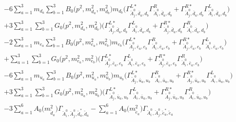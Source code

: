 \begin{itemize}
\begin{align}
 &-6 \sum_{a=1}^{3}m_{d_{{a}}} \sum_{b=1}^{3}{B_0\Big(p^{2},m^2_{d_{{a}}},m^2_{d_{{b}}}\Big)} m_{d_{{b}}} \Big({\Gamma^{L*}_{\check{A}^0_{{j}},\bar{d}_{{a}},d_{{b}}}} {\Gamma^R_{\check{A}^0_{{i}},\bar{d}_{{a}},d_{{b}}}}  + {\Gamma^{R*}_{\check{A}^0_{{j}},\bar{d}_{{a}},d_{{b}}}} {\Gamma^L_{\check{A}^0_{{i}},\bar{d}_{{a}},d_{{b}}}} \Big)  \nonumber \\ 
 &+3 \sum_{a=1}^{3}\sum_{b=1}^{3}{G_0\Big(p^{2},m^2_{d_{{a}}},m^2_{d_{{b}}}\Big)} \Big({\Gamma^{L*}_{\check{A}^0_{{j}},\bar{d}_{{a}},d_{{b}}}} {\Gamma^L_{\check{A}^0_{{i}},\bar{d}_{{a}},d_{{b}}}}  + {\Gamma^{R*}_{\check{A}^0_{{j}},\bar{d}_{{a}},d_{{b}}}} {\Gamma^R_{\check{A}^0_{{i}},\bar{d}_{{a}},d_{{b}}}} \Big) \nonumber \\ 
 &-2 \sum_{a=1}^{3}m_{e_{{a}}} \sum_{b=1}^{3}{B_0\Big(p^{2},m^2_{e_{{a}}},m^2_{e_{{b}}}\Big)} m_{e_{{b}}} \Big({\Gamma^{L*}_{\check{A}^0_{{j}},\bar{e}_{{a}},e_{{b}}}} {\Gamma^R_{\check{A}^0_{{i}},\bar{e}_{{a}},e_{{b}}}}  + {\Gamma^{R*}_{\check{A}^0_{{j}},\bar{e}_{{a}},e_{{b}}}} {\Gamma^L_{\check{A}^0_{{i}},\bar{e}_{{a}},e_{{b}}}} \Big)  \nonumber \\ 
 &+\sum_{a=1}^{3}\sum_{b=1}^{3}{G_0\Big(p^{2},m^2_{e_{{a}}},m^2_{e_{{b}}}\Big)} \Big({\Gamma^{L*}_{\check{A}^0_{{j}},\bar{e}_{{a}},e_{{b}}}} {\Gamma^L_{\check{A}^0_{{i}},\bar{e}_{{a}},e_{{b}}}}  + {\Gamma^{R*}_{\check{A}^0_{{j}},\bar{e}_{{a}},e_{{b}}}} {\Gamma^R_{\check{A}^0_{{i}},\bar{e}_{{a}},e_{{b}}}} \Big)\nonumber \\ 
 &-6 \sum_{a=1}^{3}m_{u_{{a}}} \sum_{b=1}^{3}{B_0\Big(p^{2},m^2_{u_{{a}}},m^2_{u_{{b}}}\Big)} m_{u_{{b}}} \Big({\Gamma^{L*}_{\check{A}^0_{{j}},\bar{u}_{{a}},u_{{b}}}} {\Gamma^R_{\check{A}^0_{{i}},\bar{u}_{{a}},u_{{b}}}}  + {\Gamma^{R*}_{\check{A}^0_{{j}},\bar{u}_{{a}},u_{{b}}}} {\Gamma^L_{\check{A}^0_{{i}},\bar{u}_{{a}},u_{{b}}}} \Big)  \nonumber \\ 
 &+3 \sum_{a=1}^{3}\sum_{b=1}^{3}{G_0\Big(p^{2},m^2_{u_{{a}}},m^2_{u_{{b}}}\Big)} \Big({\Gamma^{L*}_{\check{A}^0_{{j}},\bar{u}_{{a}},u_{{b}}}} {\Gamma^L_{\check{A}^0_{{i}},\bar{u}_{{a}},u_{{b}}}}  + {\Gamma^{R*}_{\check{A}^0_{{j}},\bar{u}_{{a}},u_{{b}}}} {\Gamma^R_{\check{A}^0_{{i}},\bar{u}_{{a}},u_{{b}}}} \Big) \nonumber \\ 
 &-3 \sum_{a=1}^{6}{A_0\Big(m^2_{\tilde{d}_{{a}}}\Big)} {\Gamma_{\check{A}^0_{{i}},\check{A}^0_{{j}},\tilde{d}^*_{{a}},\tilde{d}_{{a}}}}  - \sum_{a=1}^{6}{A_0\Big(m^2_{\tilde{e}_{{a}}}\Big)} {\Gamma_{\check{A}^0_{{i}},\check{A}^0_{{j}},\tilde{e}^*_{{a}},\tilde{e}_{{a}}}}  \nonumber \\ 

\end{align}
\end{itemize}
